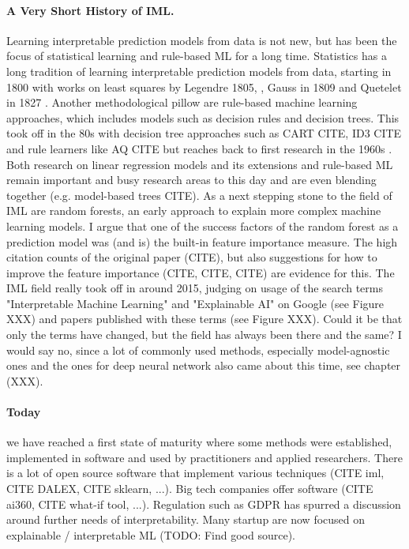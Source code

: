 \documentclass[runningheads]{llncs}
\begin{document}
\paragraph{A Very Short History of IML.}
Learning interpretable prediction models from data is not new, but has been the focus of statistical learning and rule-based ML for a long time.
Statistics has a long tradition of learning interpretable prediction  models from data, starting in 1800 \cite{stigler1986history} with works on least squares by Legendre 1805, \cite{legendre1805nouvelles}, Gauss in 1809 \cite{gauss1809theoria} and Quetelet in 1827 \cite{quetelet1827recherches}.
Another methodological pillow are rule-based machine learning approaches, which includes models such as decision rules and decision trees.
  This took off in the 80s with decision tree approaches such as CART CITE, ID3 CITE and rule learners like AQ CITE but reaches back to first research in the 1960s \cite{hajek1966guha}.
Both research on linear regression models and its extensions and rule-based ML remain important and busy research areas to this day and are even blending together (e.g. model-based trees CITE).
As a next stepping stone to the field of IML are random forests, an early approach to explain more complex machine learning models.
I argue that one of the success factors of the random forest as a prediction model was (and is) the built-in feature importance measure.
The high citation counts of the original paper (CITE), but also suggestions for how to improve the feature importance (CITE, CITE, CITE) are evidence for this.
The IML field really took off in around 2015, judging on usage of the search terms "Interpretable Machine Learning" and "Explainable AI" on Google (see Figure XXX) and papers published with these terms (see Figure XXX).
Could it be that only the terms have changed, but the field has always been there and the same?
I would say no, since a lot of commonly used methods, especially model-agnostic ones and the ones for deep neural network also came about this time, see chapter (XXX).

\paragraph{Today} we have reached a first state of maturity where some methods were established, implemented in software and used by practitioners and applied researchers.
There is a lot of open source software that implement various techniques (CITE iml, CITE DALEX, CITE sklearn, ...).
Big tech companies offer software (CITE ai360, CITE what-if tool, ...).
Regulation such as GDPR has spurred a discussion around further needs of interpretability.
Many startup are now focused on explainable / interpretable ML (TODO: Find good source).
\end{document}
